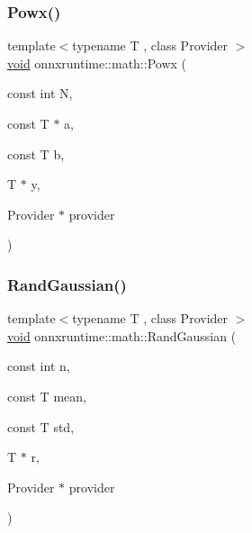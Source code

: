 \mbox{\label{namespaceonnxruntime_1_1math_a818db5fb0354360ec0fc716f810543b9}} 
\subsubsection{\texorpdfstring{Powx()}{Powx()}}
{\footnotesize\ttfamily template$<$typename T , class Provider $>$ \\
\mbox{\hyperlink{mlasi_8h_a88f941d423cb2a819b70a1358982b1a6}{void}} onnxruntime\+::math\+::\+Powx (\begin{DoxyParamCaption}\item[{const int}]{N,  }\item[{const T $\ast$}]{a,  }\item[{const T}]{b,  }\item[{T $\ast$}]{y,  }\item[{Provider $\ast$}]{provider }\end{DoxyParamCaption})}

\mbox{\label{namespaceonnxruntime_1_1math_a0bd243f8f7a07f1c3abd19a645e9b2cd}} 
\subsubsection{\texorpdfstring{Rand\+Gaussian()}{RandGaussian()}}
{\footnotesize\ttfamily template$<$typename T , class Provider $>$ \\
\mbox{\hyperlink{mlasi_8h_a88f941d423cb2a819b70a1358982b1a6}{void}} onnxruntime\+::math\+::\+Rand\+Gaussian (\begin{DoxyParamCaption}\item[{const int}]{n,  }\item[{const T}]{mean,  }\item[{const T}]{std,  }\item[{T $\ast$}]{r,  }\item[{Provider $\ast$}]{provider }\end{DoxyParamCaption})}

\mbox{\label{namespaceonnxruntime_1_1math_a942e9cce900cd43050f760c163af67c4}} 
